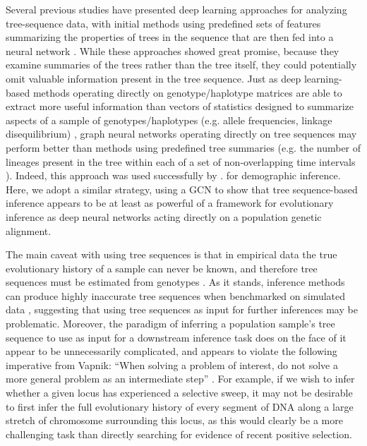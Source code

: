 Several previous studies have presented deep learning approaches for analyzing tree-sequence data, with initial methods using predefined sets of features summarizing the properties of trees in the sequence that are then fed into a neural network \cite{hejaseDeepLearningApproachInference2022,moDomainadaptiveNeuralNetworks2023a,pearsonLocalAncestryInference2023}. While these approaches showed great promise, because they examine summaries of the trees rather than the tree itself, they could potentially omit valuable information present in the tree sequence. Just as deep learning-based methods operating directly on genotype/haplotype matrices are able to extract more useful information than vectors of statistics designed to summarize aspects of a sample of genotypes/haplotypes (e.g. allele frequencies, linkage disequilibrium) \cite{flagelUnreasonableEffectivenessConvolutional2019,kernDiploSHICUpdated2018}, graph neural networks operating directly on tree sequences may perform better than methods using predefined tree summaries (e.g. the number of lineages present in the tree within each of a set of non-overlapping time intervals \cite{hejaseDeepLearningApproachInference2022}). Indeed, this approach was used successfully by \cite{korfmannSimultaneousInferenceDemography2023}. for demographic inference. Here, we adopt a similar strategy, using a GCN to show that tree sequence-based inference appears to be at least as powerful of a framework for evolutionary inference as deep neural networks acting directly on a population genetic alignment.

The main caveat with using tree sequences is that in empirical data the true evolutionary history of a sample can never be known, and therefore tree sequences must be estimated from genotypes \cite{kelleherInferringWholegenomeHistories2019,mahmoudiBayesianInferenceAncestral2022}. As it stands, inference methods can produce highly inaccurate tree sequences when benchmarked on simulated data \cite{zhangBiobankscaleInferenceAncestral2023a}, suggesting that using tree sequences as input for further inferences may be problematic. Moreover, the paradigm of inferring a population sample’s tree sequence to use as input for a downstream inference task does on the face of it appear to be unnecessarily complicated, and appears to violate the following imperative from Vapnik: “When solving a problem of interest, do not solve a more general problem as an intermediate step” \cite{vapnikEstimationDependencesBased2006}. For example, if we wish to infer whether a given locus has experienced a selective sweep, it may not be desirable to first infer the full evolutionary history of every segment of DNA along a large stretch of chromosome surrounding this locus, as this would clearly be a more challenging task than directly searching for evidence of recent positive selection.


